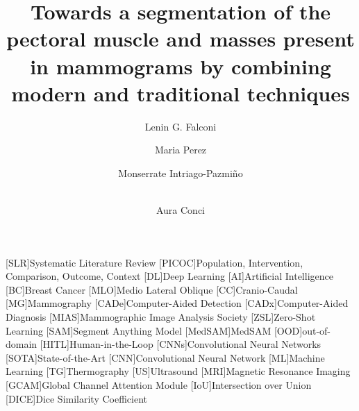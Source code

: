 \documentclass[runningheads]{llncs}
\begin{document}
%
\begin{acronym}
  [SLR]{Systematic Literature Review}
  [PICOC]{Population, Intervention, Comparison, Outcome,
    Context}
  [DL]{Deep Learning}
  [AI]{Artificial Intelligence}
  [BC]{Breast Cancer}
  [MLO]{Medio Lateral Oblique}
  [CC]{Cranio-Caudal}
  [MG]{Mammography}
  [CADe]{Computer-Aided Detection}
  [CADx]{Computer-Aided Diagnosis}
  [MIAS]{Mammographic Image Analysis Society}
  [ZSL]{Zero-Shot Learning}
  [SAM]{Segment Anything Model}
  [MedSAM]{MedSAM}
  [OOD]{out-of-domain}
  [HITL]{Human-in-the-Loop}
  [CNNs]{Convolutional Neural Networks}
  [SOTA]{State-of-the-Art}
  [CNN]{Convolutional Neural Network}
  [ML]{Machine Learning}
  [TG]{Thermography}
  [US]{Ultrasound}
  [MRI]{Magnetic Resonance Imaging}
  [GCAM]{Global Channel Attention Module}
  [IoU]{Intersection over Union}
  [DICE]{Dice Similarity Coefficient}
\end{acronym}
\title{Towards a segmentation of the pectoral muscle and masses present in mammograms by combining modern and traditional techniques}
%
%
\author{Lenin G. Falconi\and
  Maria Perez \and
  Monserrate Intriago-Pazmiño\and\\
  Aura Conci}
%
%
\end{document}
